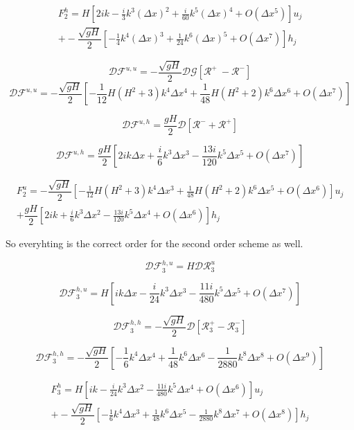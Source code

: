 \documentclass[12pt]{article}
\begin{document}
\begin{multline}
F^h_2 =H\left[2ik - \frac{i}{3} k^3(\Delta x)^2 + \frac{i}{60} k^5(\Delta x)^4 + O(\Delta x ^5) \right] u_j\\ + -\dfrac{ \sqrt{gH}}{ 2} \left [ -\frac{1}{4} k^4(\Delta x)^3  + \frac{1}{24}k^6 (\Delta x)^5 + O(\Delta x^7)\right ]h_j
\end{multline}

\[\mathcal{D}\mathcal{F}^{u,u} = - \dfrac{ \sqrt{gH}}{ 2} \mathcal{D}\mathcal{G} \left [ \mathcal{R}^+ \ -  \mathcal{R}^-  \right ]\]
\[\mathcal{D}\mathcal{F}^{u,u} = - \dfrac{ \sqrt{gH}}{ 2} \left[ -\frac{1}{12}H(H^2 +3)k^4 \Delta x^4 + \frac{1}{48}H(H^2 +2)k^6 \Delta x^6 + O(\Delta x ^7) \right ]\]

\[\mathcal{D}\mathcal{F}^{u,h} = \dfrac{ gH}{ 2}\mathcal{D} [\mathcal{R}^- + \mathcal{R}^+] \]
 
\[\mathcal{D}\mathcal{F}^{u,h} = \dfrac{ gH}{ 2}\left[2 i k \Delta x + \frac{i}{6}  k^3 \Delta x^3 - \frac{13i}{120}  k^5 \Delta x^5 + O(\Delta x ^7) \right] \]

\begin{multline}
F^u_2 = - \dfrac{ \sqrt{gH}}{ 2} \left[ -\frac{1}{12}H(H^2 +3)k^4 \Delta x^3 + \frac{1}{48}H(H^2 +2)k^6 \Delta x^5 + O(\Delta x ^6) \right ]u_j\\+ \dfrac{ gH}{ 2}\left[2 i k + \frac{i}{6}  k^3 \Delta x^2 - \frac{13i}{120}  k^5 \Delta x^4 + O(\Delta x ^6) \right]h_j
\end{multline}

So everyhting is the correct order for the second order scheme as well. 


\[\mathcal{D}\mathcal{F}_3^{h,u} = H\mathcal{D}\mathcal{R}_3^u\]

\[\mathcal{D}\mathcal{F}_3^{h,u} = H\left[i k \Delta x - \frac{i}{24} k^3 \Delta x ^3 - \frac{11i}{480 }k^5 \Delta x ^5 + O(\Delta x ^7) \right]\]

\[\mathcal{D}\mathcal{F}_3^{h,h} = -\dfrac{ \sqrt{gH}}{ 2}  \mathcal{D}\left [ \mathcal{R}_3^+- \mathcal{R}_3^- \right ]\]

\[\mathcal{D}\mathcal{F}_3^{h,h} = -\dfrac{ \sqrt{gH}}{ 2}  \left [ -\frac{1}{6} k^4 \Delta x^4 + \frac{1}{48}k^6 \Delta x^6 - \frac{1}{2880}k^8 \Delta x^8 + O(\Delta x ^9) \right]\]

\begin{multline}
F^h_3 = H\left[i k - \frac{i}{24} k^3 \Delta x ^2 - \frac{11i}{480 }k^5 \Delta x ^4 + O(\Delta x ^6) \right]u_j\\+ -\dfrac{ \sqrt{gH}}{ 2}  \left [ -\frac{1}{6} k^4 \Delta x^3 + \frac{1}{48}k^6 \Delta x^5 - \frac{1}{2880}k^8 \Delta x^7 + O(\Delta x ^8) \right]h_j
\end{multline}
\end{document}
